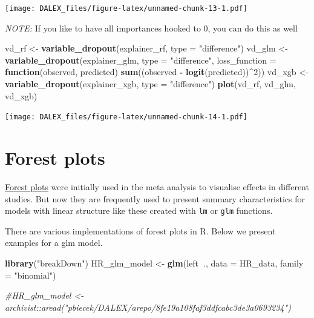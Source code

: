 \documentclass[]{book}
\newenvironment{Shaded}{\begin{snugshade}}{\end{snugshade}}
\newcommand{\KeywordTok}[1]{\textcolor[rgb]{0.13,0.29,0.53}{\textbf{#1}}}
\newcommand{\DataTypeTok}[1]{\textcolor[rgb]{0.13,0.29,0.53}{#1}}
\newcommand{\DecValTok}[1]{\textcolor[rgb]{0.00,0.00,0.81}{#1}}
\newcommand{\StringTok}[1]{\textcolor[rgb]{0.31,0.60,0.02}{#1}}
\newcommand{\CommentTok}[1]{\textcolor[rgb]{0.56,0.35,0.01}{\textit{#1}}}
\newcommand{\ControlFlowTok}[1]{\textcolor[rgb]{0.13,0.29,0.53}{\textbf{#1}}}
\newcommand{\OperatorTok}[1]{\textcolor[rgb]{0.81,0.36,0.00}{\textbf{#1}}}
\newcommand{\NormalTok}[1]{#1}
\theoremstyle{definition}
\theoremstyle{definition}
\theoremstyle{definition}
\theoremstyle{remark}
\begin{document}
\texttt{[image: DALEX\_files/figure-latex/unnamed-chunk-13-1.pdf]}

\emph{NOTE:} If you like to have all importances hooked to 0, you can do
this as well

\begin{Shaded}
\begin{Highlighting}[]
\NormalTok{vd_rf <-}\StringTok{ }\KeywordTok{variable_dropout}\NormalTok{(explainer_rf, }\DataTypeTok{type =} \StringTok{"difference"}\NormalTok{)}
\NormalTok{vd_glm <-}\StringTok{ }\KeywordTok{variable_dropout}\NormalTok{(explainer_glm, }\DataTypeTok{type =} \StringTok{"difference"}\NormalTok{,}
                        \DataTypeTok{loss_function =} \ControlFlowTok{function}\NormalTok{(observed, predicted) }\KeywordTok{sum}\NormalTok{((observed }\OperatorTok{-}\StringTok{ }\KeywordTok{logit}\NormalTok{(predicted))}\OperatorTok{^}\DecValTok{2}\NormalTok{))}
\NormalTok{vd_xgb <-}\StringTok{ }\KeywordTok{variable_dropout}\NormalTok{(explainer_xgb, }\DataTypeTok{type =} \StringTok{"difference"}\NormalTok{)}
\KeywordTok{plot}\NormalTok{(vd_rf, vd_glm, vd_xgb)}
\end{Highlighting}
\end{Shaded}

\texttt{[image: DALEX\_files/figure-latex/unnamed-chunk-14-1.pdf]}

\section{Forest plots}\label{forest-plots}

\href{https://en.wikipedia.org/wiki/Forest_plot}{Forest plots} were
initially used in the meta analysis to visualise effects in different
studies. But now they are frequently used to present summary
characteristics for models with linear structure like these created with
\texttt{lm} or \texttt{glm} functions.

There are various implementations of forest plots in R. Below we present
examples for a glm model.

\begin{Shaded}
\begin{Highlighting}[]
\KeywordTok{library}\NormalTok{(}\StringTok{"breakDown"}\NormalTok{)}
\NormalTok{HR_glm_model <-}\StringTok{ }\KeywordTok{glm}\NormalTok{(left}\OperatorTok{~}\NormalTok{., }\DataTypeTok{data =}\NormalTok{ HR_data, }\DataTypeTok{family =} \StringTok{"binomial"}\NormalTok{)}


\CommentTok{#HR_glm_model <- archivist::aread("pbiecek/DALEX/arepo/8fe19a108faf3ddfcabc3de3a0693234")}
\end{Highlighting}
\end{Shaded}
\end{document}
